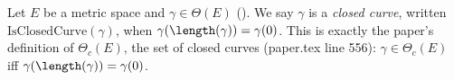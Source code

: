\begin{definition}
  Let $E$ be a metric space and $\gamma \in \Theta(E)$ (). We say $\gamma$ is a
  \emph{closed curve}, written $\mathrm{IsClosedCurve}(\gamma)$, when
  $\gamma(\length(\gamma)) = \gamma(0)$. This is exactly the paper's definition of $\Theta_c(E)$,
  the set of closed curves (paper.tex line 556): $\gamma \in \Theta_c(E)$ iff
  $\gamma(\length(\gamma))=\gamma(0)$.
\end{definition}
